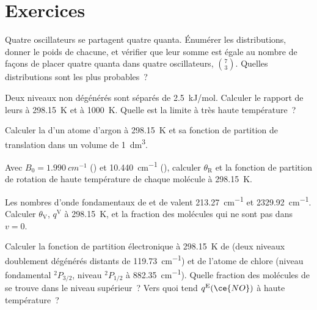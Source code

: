 \section{Exercices}

\begin{exercise}[$\star$]\label{exo:b3:partition-functions:1}
Quatre oscillateurs se partagent quatre quanta. Énumérer les
distributions, donner le poids de chacune, et vérifier que leur somme est
égale au nombre de façons de placer quatre quanta  dans
quatre oscillateurs, $\binom{7}{3}$. Quelles distributions sont les plus
probables~?
\end{exercise}

\begin{exercise}[$\star$]\label{exo:b3:partition-functions:2}
Deux niveaux non dégénérés sont séparés de \qty{2.5}{kJ/mol}. Calculer le
rapport de leurs  à \qty{298.15}{K} et à \qty{1000}{K}.
Quelle est la limite à très haute température~?
\end{exercise}

\begin{exercise}[$\star$]\label{exo:b3:partition-functions:3}
Calculer la  d'un atome d'argon à
\qty{298.15}{K} et sa fonction de partition de translation dans un volume
de \qty{1}{dm^3}.
\end{exercise}

\begin{exercise}[$\star$]\label{exo:b3:partition-functions:4}
Avec $B_0 = \qty{1.990}{cm^{-1}}$ () et \qty{10.440}{cm^{-1}}
(), calculer $\theta_{\mathrm R}$ et la fonction de
partition de rotation de haute température de chaque molécule à
\qty{298.15}{K}.
\end{exercise}

\begin{exercise}[$\star\star$]\label{exo:b3:partition-functions:5}
Les nombres d'onde fondamentaux de  et de  valent
\qty{213.27}{cm^{-1}} et
\qty{2329.92}{cm^{-1}}. Calculer $\theta_{\mathrm V}$, $q^{\mathrm V}$ à
\qty{298.15}{K}, et la fraction des molécules qui ne sont pas dans
$v = 0$.
\end{exercise}

\begin{exercise}[$\star\star$]\label{exo:b3:partition-functions:6}
Calculer la fonction de partition électronique à \qty{298.15}{K} de
 (deux niveaux doublement dégénérés distants de
\qty{119.73}{cm^{-1}}) et de l'atome de chlore (niveau fondamental
${}^2P_{3/2}$, niveau ${}^2P_{1/2}$ à \qty{882.35}{cm^{-1}}). Quelle
fraction des molécules de  se trouve dans le niveau supérieur~?
Vers quoi tend $q^{\mathrm E}(\ce{NO})$ à haute température~?
\end{exercise}


